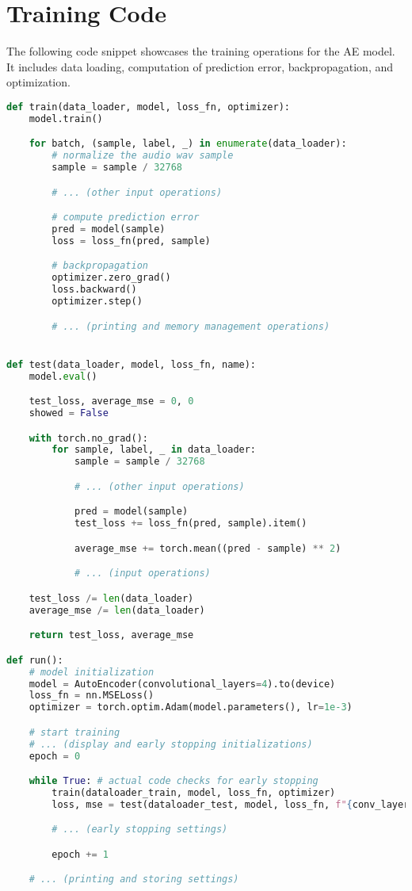 \section{Training Code}
The following code snippet showcases the training operations for the \ac{AE} model. It includes data loading, computation of prediction error, backpropagation, and optimization.

\begin{lstlisting}[language=Python, caption={Training operations}]
def train(data_loader, model, loss_fn, optimizer):
    model.train()

    for batch, (sample, label, _) in enumerate(data_loader):
        # normalize the audio wav sample
        sample = sample / 32768

        # ... (other input operations)

        # compute prediction error
        pred = model(sample)
        loss = loss_fn(pred, sample)

        # backpropagation
        optimizer.zero_grad()
        loss.backward()
        optimizer.step()

        # ... (printing and memory management operations)


def test(data_loader, model, loss_fn, name):
    model.eval()

    test_loss, average_mse = 0, 0
    showed = False

    with torch.no_grad():
        for sample, label, _ in data_loader:
            sample = sample / 32768

            # ... (other input operations)

            pred = model(sample)
            test_loss += loss_fn(pred, sample).item()

            average_mse += torch.mean((pred - sample) ** 2)

            # ... (input operations)

    test_loss /= len(data_loader)
    average_mse /= len(data_loader)

    return test_loss, average_mse

def run():
    # model initialization
    model = AutoEncoder(convolutional_layers=4).to(device)
    loss_fn = nn.MSELoss()
    optimizer = torch.optim.Adam(model.parameters(), lr=1e-3)

    # start training
    # ... (display and early stopping initializations)
    epoch = 0

    while True: # actual code checks for early stopping
        train(dataloader_train, model, loss_fn, optimizer)
        loss, mse = test(dataloader_test, model, loss_fn, f"{conv_layers}_{epoch}")

        # ... (early stopping settings)

        epoch += 1

    # ... (printing and storing settings)
\end{lstlisting}

